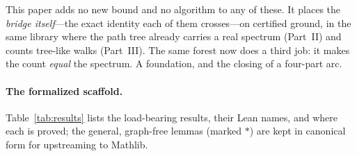 \documentclass[11pt]{article}
\begin{document}
This paper adds no new bound and no algorithm to any of these. It places the \emph{bridge itself}---the
exact identity each of them crosses---on certified ground, in the same library where the path tree
already carries a real spectrum (Part~II) and counts tree-like walks (Part~III). The same forest now
does a third job: it makes the count \emph{equal} the spectrum. A foundation, and the closing of a
four-part arc.

\paragraph{The formalized scaffold.} Table~\ref{tab:results} lists the load-bearing results, their
Lean names, and where each is proved; the general, graph-free lemmas (marked $\ast$) are kept in
canonical form for upstreaming to Mathlib.
\end{document}
